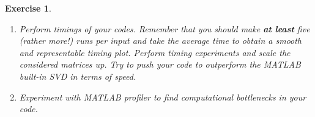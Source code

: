 \documentclass[11pt]{article}
\newtheorem{exercise}[theorem]{Exercise}
\begin{document}
\begin{exercise}
\begin{enumerate}
\begin{enumerate}
        \item Perform timings of your codes. Remember that you should make {\bf at least} five (rather more!) runs per input and take the average time to obtain a smooth and representable timing plot. Perform timing experiments and scale the considered matrices up. Try to push your code to outperform the MATLAB built-in SVD in terms of speed.  
        \item Experiment with MATLAB profiler to find computational bottlenecks in your code.
    \end{enumerate}
\end{enumerate}
 
\end{exercise}

 
 
\end{document}
